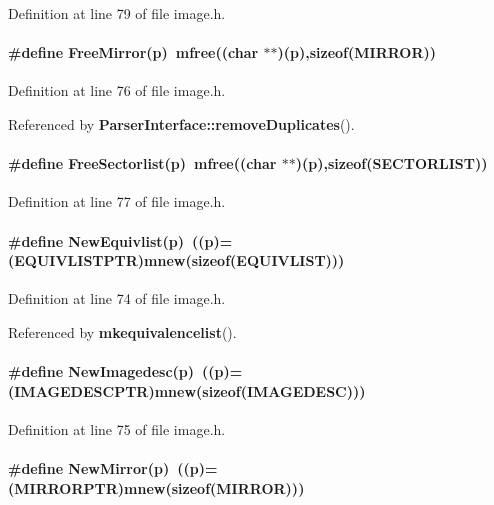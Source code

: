 Definition at line 79 of file image.h.\label{image.h_a8}
\paragraph{\setlength{\rightskip}{0pt plus 5cm}\#define Free\-Mirror(p)\ mfree((char $\ast$$\ast$)(p),sizeof({\bf MIRROR}))}\hfill



Definition at line 76 of file image.h.

Referenced by {\bf Parser\-Interface::remove\-Duplicates}().\label{image.h_a9}
\paragraph{\setlength{\rightskip}{0pt plus 5cm}\#define Free\-Sectorlist(p)\ mfree((char $\ast$$\ast$)(p),sizeof({\bf SECTORLIST}))}\hfill



Definition at line 77 of file image.h.\label{image.h_a6}
\paragraph{\setlength{\rightskip}{0pt plus 5cm}\#define New\-Equivlist(p)\ ((p)=({\bf EQUIVLISTPTR})mnew(sizeof({\bf EQUIVLIST})))}\hfill



Definition at line 74 of file image.h.

Referenced by {\bf mkequivalencelist}().\label{image.h_a7}
\paragraph{\setlength{\rightskip}{0pt plus 5cm}\#define New\-Imagedesc(p)\ ((p)=({\bf IMAGEDESCPTR})mnew(sizeof({\bf IMAGEDESC})))}\hfill



Definition at line 75 of file image.h.\label{image.h_a4}
\paragraph{\setlength{\rightskip}{0pt plus 5cm}\#define New\-Mirror(p)\ ((p)=({\bf MIRRORPTR})mnew(sizeof({\bf MIRROR})))}\hfill



